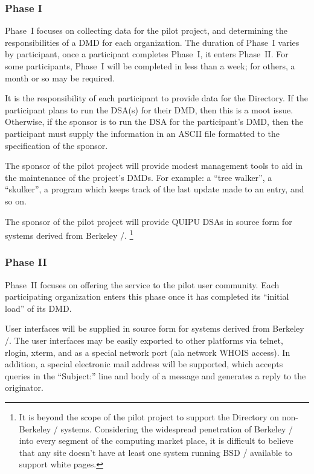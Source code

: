 \subsubsection	{Phase I}
Phase~I focuses on collecting data for the pilot project,
and determining the responsibilities of a DMD for each organization.
The duration of Phase~I varies by participant,
once a participant completes Phase~I,
it enters Phase~II.
For some participants,
Phase~I will be completed in less than a week;
for others,
a month or so may be required.

It is the responsibility of each participant to provide data for the
Directory.
If the participant plans to run the DSA(s) for their DMD,
then this is a moot issue.
Otherwise,
if the sponsor is to run the DSA for the participant's DMD,
then the participant must supply the information in an ASCII file
formatted to the specification of the sponsor.

The sponsor of the pilot project will provide modest management tools
to aid in the maintenance of the project's DMDs.
For example:
a ``tree walker'',
a ``skulker'',
a program which keeps track of the last update made to an entry,
and so on.

The sponsor of the pilot project will provide QUIPU DSAs in source form
for systems derived from Berkeley \unix/.%
\footnote{It is beyond the scope of the pilot project to support the Directory
on non-Berkeley \unix/ systems.
Considering the widespread penetration of Berkeley \unix/ into every segment
of the computing market place,
it is difficult to believe that any site doesn't have at least one system
running BSD \unix/ available to support white pages.}

\subsubsection	{Phase II}
Phase~II focuses on offering the service to the pilot user community.
Each participating organization enters this phase once it has completed its
``initial load'' of its DMD.

User interfaces will be supplied in source form for systems derived from
Berkeley \unix/. 
The user interfaces may be easily exported to other platforms via telnet,
rlogin, xterm, and as a special network port (ala network WHOIS access).
In addition,
a special electronic mail address will be supported,
which accepts queries in the ``Subject:'' line and body of a message
and generates a reply to the originator.


